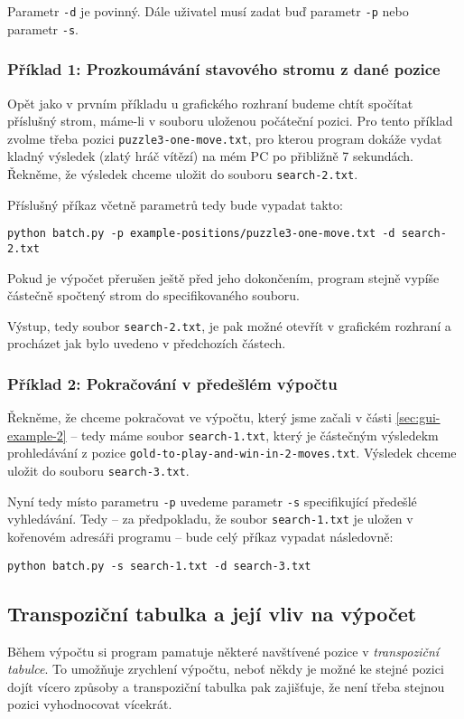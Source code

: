 \documentclass{article}
\begin{document}
Parametr \texttt{-d} je povinný. Dále uživatel musí zadat buď parametr \texttt{-p} nebo parametr \texttt{-s}.

\subsubsection{Příklad 1: Prozkoumávání stavového stromu z dané pozice}
Opět jako v prvním příkladu u grafického rozhraní budeme chtít spočítat příslušný strom, máme-li v souboru uloženou
počáteční pozici. Pro tento příklad zvolme třeba pozici \texttt{puzzle3-one-move.txt}, pro kterou program dokáže vydat
kladný výsledek (zlatý hráč vítězí) na mém PC po přibližně 7 sekundách. Řekněme, že výsledek chceme uložit do souboru
\texttt{search-2.txt}.

Příslušný příkaz včetně parametrů tedy bude vypadat takto:
\begin{center}\verb+python batch.py -p example-positions/puzzle3-one-move.txt -d search-2.txt+\end{center}

Pokud je výpočet přerušen ještě před jeho dokončením, program stejně vypíše částečně spočtený strom do specifikovaného
souboru.

Výstup, tedy soubor \texttt{search-2.txt}, je pak možné otevřít v grafickém rozhraní a procházet jak bylo uvedeno v
předchozích částech.

\subsubsection{Příklad 2: Pokračování v předešlém výpočtu}
Řekněme, že chceme pokračovat ve výpočtu, který jsme začali v části \ref{sec:gui-example-2} -- tedy máme soubor
\texttt{search-1.txt}, který je částečným výsledekm prohledávání z pozice \texttt{gold-to-play-and-win-in-2-moves.txt}.
Výsledek chceme uložit do souboru \texttt{search-3.txt}.

Nyní tedy místo parametru \texttt{-p} uvedeme parametr \texttt{-s} specifikující předešlé vyhledávání. Tedy -- za
předpokladu, že soubor \texttt{search-1.txt} je uložen v kořenovém adresáři programu -- bude celý příkaz vypadat
následovně:
\begin{center}\verb+python batch.py -s search-1.txt -d search-3.txt+\end{center}

\subsection{Transpoziční tabulka a její vliv na výpočet}
Během výpočtu si program pamatuje některé navštívené pozice v \emph{transpoziční tabulce}. To umožňuje zrychlení
výpočtu, neboť někdy je možné ke stejné pozici dojít vícero způsoby a transpoziční tabulka pak zajišťuje, že není třeba
stejnou pozici vyhodnocovat vícekrát.
\end{document}
